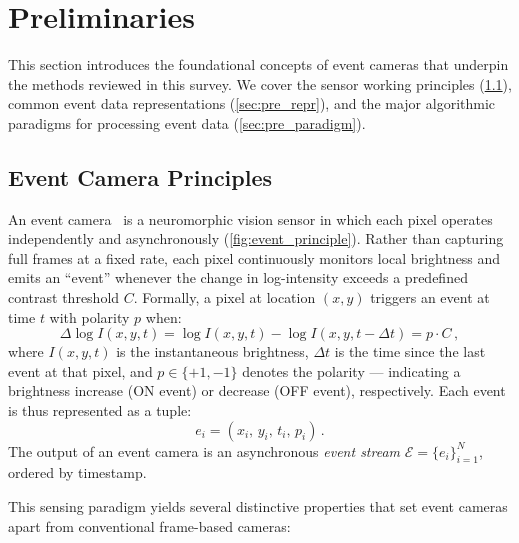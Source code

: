 \section{Preliminaries}
\label{sec:pre}

This section introduces the foundational concepts of event cameras that underpin the methods reviewed in this survey. We cover the sensor working principles (\cref{sec:pre_sensor}), common event data representations (\cref{sec:pre_repr}), and the major algorithmic paradigms for processing event data (\cref{sec:pre_paradigm}).


\subsection{Event Camera Principles}
\label{sec:pre_sensor}

An event camera~\cite{lichtsteiner2008dvs} is a neuromorphic vision sensor in which each pixel operates independently and asynchronously (\cref{fig:event_principle}). Rather than capturing full frames at a fixed rate, each pixel continuously monitors local brightness and emits an ``event'' whenever the change in log-intensity exceeds a predefined contrast threshold $C$. Formally, a pixel at location $(x, y)$ triggers an event at time $t$ with polarity $p$ when:
\begin{equation}
\label{eq:event_model}
    \Delta \log I(x, y, t) = \log I(x, y, t) - \log I(x, y, t - \Delta t) = p \cdot C \,,
\end{equation}
where $I(x, y, t)$ is the instantaneous brightness, $\Delta t$ is the time since the last event at that pixel, and $p \in \{+1, -1\}$ denotes the polarity --- indicating a brightness increase (ON event) or decrease (OFF event), respectively. Each event is thus represented as a tuple:
\begin{equation}
\label{eq:event_tuple}
    e_i = (x_i, \, y_i, \, t_i, \, p_i) \,.
\end{equation}
The output of an event camera is an asynchronous \textit{event stream} $\mathcal{E} = \{e_i\}_{i=1}^{N}$, ordered by timestamp.

This sensing paradigm yields several distinctive properties that set event cameras apart from conventional frame-based cameras:

